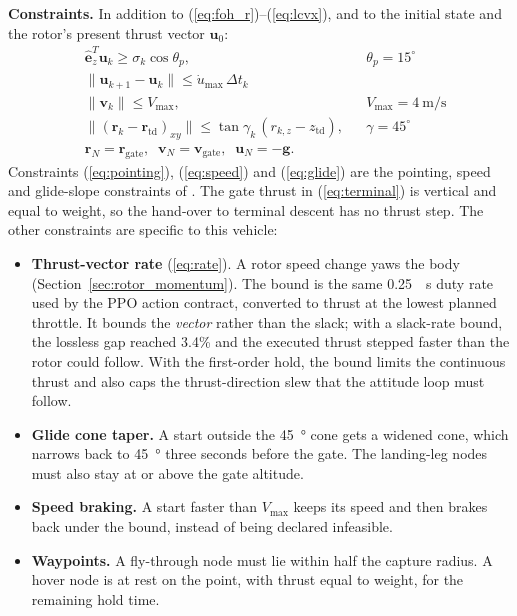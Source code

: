 \documentclass[conference]{IEEEtran}
\begin{document}
\textbf{Constraints.} In addition to (\ref{eq:foh_r})--(\ref{eq:lcvx}), and to the initial state and the rotor's present thrust vector $\mathbf{u}_0$:
\begin{align}
&\hat{\mathbf{e}}_z^T\mathbf{u}_k \ge \sigma_k\cos\theta_p, && \theta_p = 15^\circ \label{eq:pointing}\\
&\|\mathbf{u}_{k+1} - \mathbf{u}_k\| \le \dot{u}_{\max}\,\Delta t_k \label{eq:rate}\\
&\|\mathbf{v}_k\| \le V_{\max}, && V_{\max} = \SI{4}{\metre\per\second} \label{eq:speed}\\
&\|(\mathbf{r}_k - \mathbf{r}_{\text{td}})_{xy}\| \le \tan\gamma_k\,(r_{k,z} - z_{\text{td}}), && \gamma = 45^\circ \label{eq:glide}\\
&\mathbf{r}_N = \mathbf{r}_{\text{gate}},\;\; \mathbf{v}_N = \mathbf{v}_{\text{gate}},\;\; \mathbf{u}_N = -\mathbf{g}. \label{eq:terminal}
\end{align}
Constraints (\ref{eq:pointing}), (\ref{eq:speed}) and (\ref{eq:glide}) are the pointing, speed and glide-slope constraints of \cite{b21}. The gate thrust in (\ref{eq:terminal}) is vertical and equal to weight, so the hand-over to terminal descent has no thrust step. The other constraints are specific to this vehicle:
\begin{itemize}
    \item \textbf{Thrust-vector rate} (\ref{eq:rate}). A rotor speed change yaws the body (Section~\ref{sec:rotor_momentum}). The bound is the same \SI{0.25}{\per\second} duty rate used by the PPO action contract, converted to thrust at the lowest planned throttle. It bounds the \emph{vector} rather than the slack; with a slack-rate bound, the lossless gap reached 3.4\% and the executed thrust stepped faster than the rotor could follow. With the first-order hold, the bound limits the continuous thrust and also caps the thrust-direction slew that the attitude loop must follow.
    \item \textbf{Glide cone taper.} A start outside the \SI{45}{\degree} cone gets a widened cone, which narrows back to \SI{45}{\degree} three seconds before the gate. The landing-leg nodes must also stay at or above the gate altitude.
    \item \textbf{Speed braking.} A start faster than $V_{\max}$ keeps its speed and then brakes back under the bound, instead of being declared infeasible.
    \item \textbf{Waypoints.} A fly-through node must lie within half the capture radius. A hover node is at rest on the point, with thrust equal to weight, for the remaining hold time.
\end{itemize}
\end{document}
